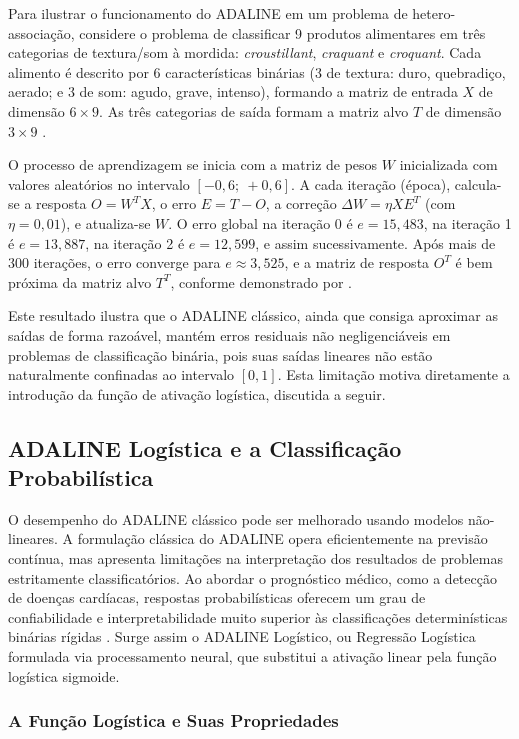 Para ilustrar o funcionamento do ADALINE em um problema de hetero-associação, considere o problema de classificar 9 produtos alimentares em três categorias de textura/som à mordida: \textit{croustillant}, \textit{craquant} e \textit{croquant}. Cada alimento é descrito por 6 características binárias (3 de textura: duro, quebradiço, aerado; e 3 de som: agudo, grave, intenso), formando a matriz de entrada $X$ de dimensão $6 \times 9$. As três categorias de saída formam a matriz alvo $T$ de dimensão $3 \times 9$ \cite{abdi1994}.

O processo de aprendizagem se inicia com a matriz de pesos $W$ inicializada com valores aleatórios no intervalo $[-0{,}6;\ +0{,}6]$. A cada iteração (época), calcula-se a resposta $O = W^T X$, o erro $E = T - O$, a correção $\Delta W = \eta X E^T$ (com $\eta = 0{,}01$), e atualiza-se $W$. O erro global na iteração 0 é $e = 15{,}483$, na iteração 1 é $e = 13{,}887$, na iteração 2 é $e = 12{,}599$, e assim sucessivamente. Após mais de 300 iterações, o erro converge para $e \approx 3{,}525$, e a matriz de resposta $O^T$ é bem próxima da matriz alvo $T^T$, conforme demonstrado por .

Este resultado ilustra que o ADALINE clássico, ainda que consiga aproximar as saídas de forma razoável, mantém erros residuais não negligenciáveis em problemas de classificação binária, pois suas saídas lineares não estão naturalmente confinadas ao intervalo $[0, 1]$. Esta limitação motiva diretamente a introdução da função de ativação logística, discutida a seguir.

\subsection{ADALINE Logística e a Classificação Probabilística}

O desempenho do ADALINE clássico pode ser melhorado usando modelos não-lineares. A formulação clássica do ADALINE opera eficientemente na previsão contínua, mas apresenta limitações na interpretação dos resultados de problemas estritamente classificatórios. Ao abordar o prognóstico médico, como a detecção de doenças cardíacas, respostas probabilísticas oferecem um grau de confiabilidade e interpretabilidade muito superior às classificações determinísticas binárias rígidas \cite{braga2007}. Surge assim o ADALINE Logístico, ou Regressão Logística formulada via processamento neural, que substitui a ativação linear pela função logística sigmoide.

\subsubsection{A Função Logística e Suas Propriedades}


